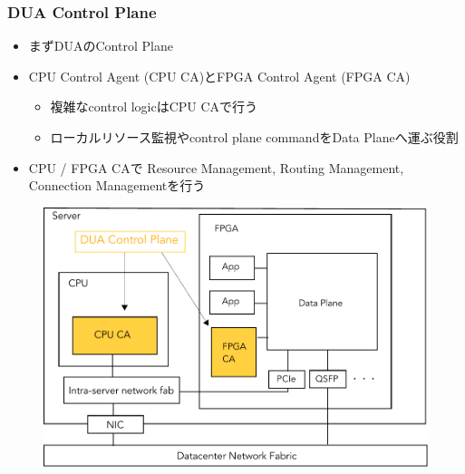 \documentclass[dvipdfmx,9pt,notheorems]{beamer}
\theoremstyle{definition}
\begin{document}
\begin{frame}\frametitle{DUA Control Plane}
	\begin{itemize}
		\item まずDUAのControl Plane
		\item CPU Control Agent (CPU CA)とFPGA Control Agent (FPGA CA)
			\begin{itemize}
				\item 複雑なcontrol logicはCPU CAで行う
				\item ローカルリソース監視やcontrol plane commandをData Planeへ運ぶ役割
			\end{itemize}
		\item CPU / FPGA CAで{\color{red} Resource Management, Routing Management, Connection Management}を行う
	\end{itemize}
  \begin{figure}[htb]
		\includegraphics[scale=0.4]{fig/ez_DUA_ControlPlane.pdf}
  \end{figure}
\pnote{
}
\end{frame}
\end{document}
